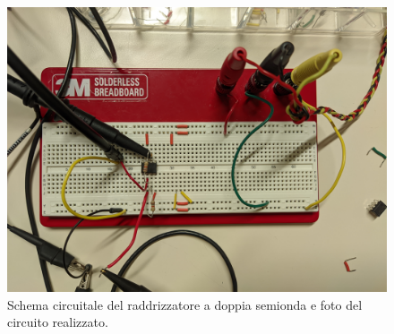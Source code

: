 \begin{figure}[ht!]
\begin{minipage}{.45\textwidth}
		\includegraphics[width=\linewidth]{./ImageFiles/Laboratorio 3/CIR11.jpg}
	\end{minipage}
	\caption{Schema circuitale del raddrizzatore a doppia semionda e foto del circuito realizzato.}
	\label{fig:circuito_3}
\end{figure}

